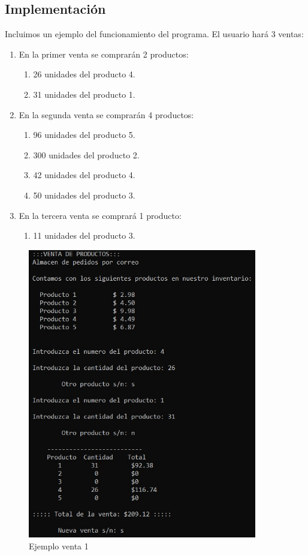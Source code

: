 \documentclass[12pt, letterpaper]{article}
\begin{document}
    \subsection{Implementación}
    Incluimos un ejemplo del funcionamiento del programa.
    El usuario hará 3 ventas:
    \begin{enumerate}
       \item En la primer venta se comprarán 2 productos: 
       \begin{enumerate}
             \item 26 unidades del producto 4.
             \item 31 unidades del producto 1.
         \end{enumerate}
         
       \item En la segunda venta se comprarán 4 productos:
       \begin{enumerate}
             \item 96 unidades del producto 5.
             \item 300 unidades del producto 2.
             \item 42 unidades del producto 4.
             \item 50 unidades del producto 3.
         \end{enumerate}
         
       \item En la tercera venta se comprará 1 producto:
       \begin{enumerate}
             \item 11 unidades del producto 3.
         \end{enumerate}
    \end{enumerate}       
    
    \vspace{1.5cm}
  
    \begin{figure}[h]
    \centering
    \includegraphics[width=10cm]{venta1.jpg}
    \caption {Ejemplo venta 1 \label{fig:Fig13}}
    \end{figure} 
             
\end{document}
